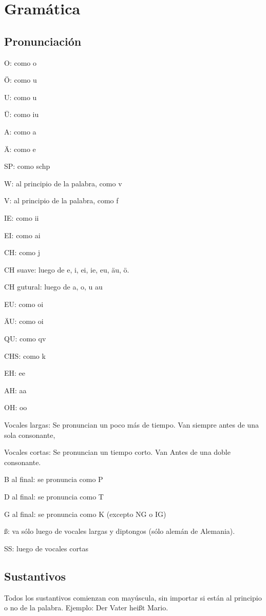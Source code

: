 \chapter{Gramática}

\section{Pronunciación}
\begin{myitemize}
\item O: como o
\item Ö: como u
\item U: como u
\item Ü: como iu
\item A: como a
\item Ä: como e
\item SP: como schp
\item W: al principio de la palabra, como v
\item V: al principio de la palabra, como f
\item IE: como ii
\item EI: como ai
\item CH: como j
\item CH suave: luego de e, i, ei, ie, eu, äu, ö.
\item CH gutural: luego de a, o, u au
\item EU: como oi
\item ÄU: como oi
\item QU: como qv
\item CHS: como k 
\item EH: ee
\item AH: aa
\item OH: oo
\item Vocales largas: Se pronuncian un poco más de tiempo. Van siempre antes de una sola consonante,
\item Vocales cortas: Se pronuncian un tiempo corto. Van Antes de una doble consonante.
\item B al final: se pronuncia como P
\item D al final: se pronuncia como T
\item G al final: se pronuncia como K (excepto NG o IG)
\item ß: va sólo luego de vocales largas y diptongos (sólo alemán de Alemania).
\item SS: luego de vocales cortas
\end{myitemize}


\section{Sustantivos}
Todos los sustantivos comienzan con mayúscula, sin importar si están al principio o no de la palabra.
Ejemplo: Der Vater heißt Mario.

